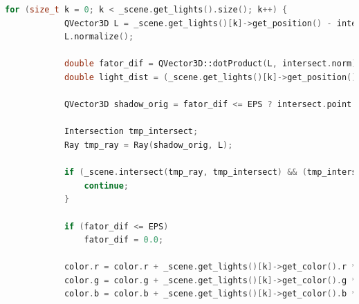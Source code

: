 \begin{lstlisting}[label=raytracing2,caption=Реализация алгоритма испускания луча (продолжение), language=C++]
		for (size_t k = 0; k < _scene.get_lights().size(); k++) {
			QVector3D L = _scene.get_lights()[k]->get_position() - intersect.point;
			L.normalize();
			
			double fator_dif = QVector3D::dotProduct(L, intersect.norm);
			double light_dist = (_scene.get_lights()[k]->get_position() - intersect.point).length();
			
			QVector3D shadow_orig = fator_dif <= EPS ? intersect.point - intersect.norm * EPS : intersect.point + intersect.norm * EPS;
			
			Intersection tmp_intersect;
			Ray tmp_ray = Ray(shadow_orig, L);
			
			if (_scene.intersect(tmp_ray, tmp_intersect) && (tmp_intersect.point - shadow_orig).length() < light_dist && fabs(tmp_intersect.material.get_k_refr()) < EPS) {
				continue;
			}
			
			if (fator_dif <= EPS)
				fator_dif = 0.0;
			
			color.r = color.r + _scene.get_lights()[k]->get_color().r * _scene.get_lights()[k]->get_intensity() * fator_dif * intersect.material.get_diffuse().r * intersect.material.get_kd();
			color.g = color.g + _scene.get_lights()[k]->get_color().g * _scene.get_lights()[k]->get_intensity() * fator_dif * intersect.material.get_diffuse().g * intersect.material.get_kd();
			color.b = color.b + _scene.get_lights()[k]->get_color().b * _scene.get_lights()[k]->get_intensity() * fator_dif * intersect.material.get_diffuse().b * intersect.material.get_kd();
\end{lstlisting}
\clearpage
